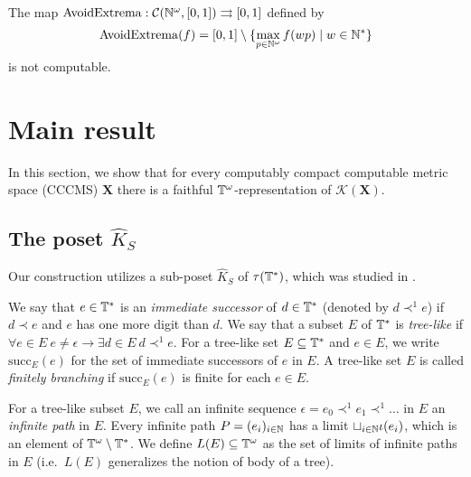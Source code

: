 \documentclass{eptcs-modified}
\begin{document}
\begin{corollary}
The map $\operatorname{AvoidExtrema} : \mathcal{C}({\mathbb{N}^\omega}, [0,1]) \rightrightarrows [0,1]$ defined by $$\operatorname{AvoidExtrema}(f) = [0,1] \setminus \{\max_{p \in {\mathbb{N}^\omega}} f(wp) \mid w \in \mathbb{N}^*\}$$ is not computable.
\end{corollary}

\section{Main result}
\label{sec:mainresult}
In this section, we show that for every computably compact computable metric space (CCCMS) $\mathbf{X}$ there is a faithful $\mathbb{T}^\omega$-representation of $\mathcal{K}(\mathbf{X})$.

\subsection{The poset $\widehat{K}_S$}

Our construction utilizes
a sub-poset $\widehat{K}_S$ of $\tau(\mathbb{T}^*)$, which was studied in \cite{tsuiki4}.


We say that $e \in \mathbb{T}^*$ is an \emph{immediate successor} of $d \in \mathbb{T}^*$
(denoted by $d \prec^1 e$)
if $d \prec e$ and $e$ has one more digit than $d$.
We say that a subset $E$ of $\mathbb{T}^*$  is \emph{tree-like} if
$\forall e \in E\  e \ne \epsilon \to \exists d \in E\ d \prec^1 e$.
For a tree-like set $E \subseteq \mathbb{T}^*$ and $e \in E$,
we write $\mathrm{succ}_E(e)$ for the set of immediate successors of $e$ in $E$.
A tree-like set $E$ is called \emph{finitely branching} if
$\mathrm{succ}_E(e)$ is finite for each $e \in E$.

For a tree-like subset $E$,
we call an infinite sequence $ \epsilon = e_0\prec^1 e_1 \prec^1 \ldots$ in $E$ an \emph{infinite path} in $E$.
Every infinite path $P= (e_i)_{i \in \mathbb{N}}$  has a limit $\sqcup_{i \in \mathbb{N}} \iota(e_i)$,
which is an element of $\mathbb{T}^\omega \setminus \mathbb{T}^*$.
We define $L(E) \subseteq \mathbb{T}^\omega$ as the set of limits of infinite paths in $E$ (i.e.~$L(E)$ generalizes the notion of body of a tree).
\end{document}
